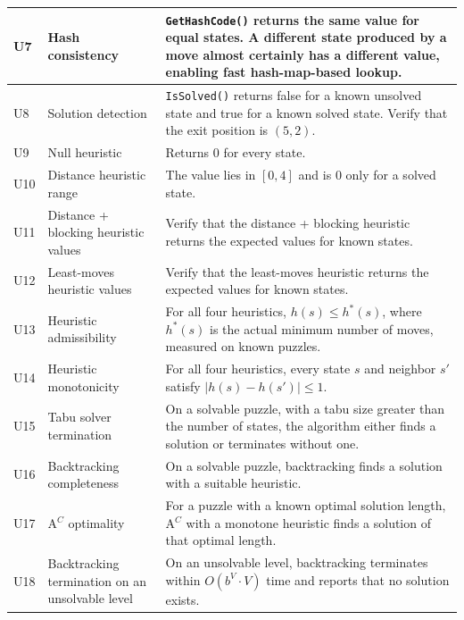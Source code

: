 \begin{center}
\begin{longtable}{ | P{0.05\textwidth} | P{0.30\textwidth} | P{0.55\textwidth} | }
U7
& Hash consistency
& \texttt{GetHashCode()} returns the same value for equal states. A different state produced by a move almost certainly has a different value, enabling fast hash-map-based lookup.
\\ \hline

U8
& Solution detection
& \texttt{IsSolved()} returns false for a known unsolved state and true for a known solved state. Verify that the exit position is $(5,2)$.
\\ \hline

U9
& Null heuristic
& Returns 0 for every state.
\\ \hline

U10
& Distance heuristic range
& The value lies in $[0, 4]$ and is 0 only for a solved state.
\\ \hline

U11
& Distance + blocking heuristic values
& Verify that the distance + blocking heuristic returns the expected values for known states.
\\ \hline

U12
& Least-moves heuristic values
& Verify that the least-moves heuristic returns the expected values for known states.
\\ \hline

U13
& Heuristic admissibility
& For all four heuristics, $h(s) \leq h^*(s)$, where $h^*(s)$ is the actual minimum number of moves, measured on known puzzles.
\\ \hline

U14
& Heuristic monotonicity
& For all four heuristics, every state $s$ and neighbor $s'$ satisfy $| h(s) - h(s') | \leq 1$.
\\ \hline

U15
& Tabu solver termination
& On a solvable puzzle, with a tabu size greater than the number of states, the algorithm either finds a solution or terminates without one.
\\ \hline

U16
& Backtracking completeness
& On a solvable puzzle, backtracking finds a solution with a suitable heuristic.
\\ \hline

U17
& A$^C$ optimality
& For a puzzle with a known optimal solution length, A$^C$ with a monotone heuristic finds a solution of that optimal length.
\\ \hline

U18
& Backtracking termination on an unsolvable level
& On an unsolvable level, backtracking terminates within $O(b^V \cdot V)$ time and reports that no solution exists.
\\ \hline


\end{longtable}
\end{center}
